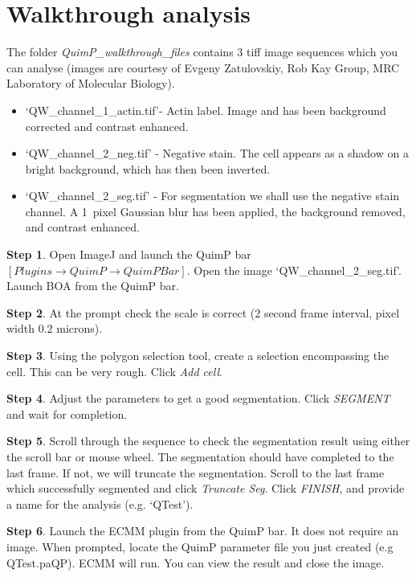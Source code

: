 \documentclass[a4paper,12pt]{article}
\begin{document}
\section{Walkthrough analysis}
\label{walkthrough}

The folder \emph{QuimP\_walkthrough\_files} contains 3 tiff image sequences which you can
analyse (images are courtesy of Evgeny Zatulovskiy, Rob Kay Group, MRC Laboratory of Molecular Biology).

\begin{itemize}
	\item `QW\_channel\_1\_actin.tif'- Actin label.  Image and has been background corrected and contrast enhanced.
	\item `QW\_channel\_2\_neg.tif' - Negative stain.  The cell appears as a shadow on a bright
	background, which has then been inverted.
	\item `QW\_channel\_2\_seg.tif' - For segmentation we shall use the negative stain channel.  
	A 1~pixel Gaussian blur has been applied, the background removed, and contrast enhanced.  
\end{itemize}

\textbf{Step 1}. Open ImageJ and launch the QuimP bar $[Plugins\rightarrow QuimP\rightarrow QuimP Bar]$.  Open the image `QW\_channel\_2\_seg.tif'.  Launch BOA from the QuimP bar.

\textbf{Step 2}. At the prompt check the scale is correct (2 second frame interval, pixel width 0.2 microns).

\textbf{Step 3}. Using the polygon selection tool, create a selection encompassing the cell. This can be very rough.
Click \emph{Add cell}.

\textbf{Step 4}.  Adjust the parameters to get a good segmentation.  Click \emph{SEGMENT} and wait for completion.

\textbf{Step 5}. Scroll through the sequence to check the segmentation result using either the scroll bar or mouse
wheel. The segmentation should have completed to the last frame.  If not, we will truncate the segmentation.
Scroll to the last frame which successfully segmented and click \emph{Truncate Seg}.
Click \emph{FINISH}, and provide a name for the analysis (e.g. `QTest').

\textbf{Step 6}. Launch the ECMM plugin from the QuimP bar. It does not require an image. When prompted,
locate the QuimP parameter file you just created (e.g QTest.paQP).  ECMM will run.
You can view the result and close the image.
\end{document}
